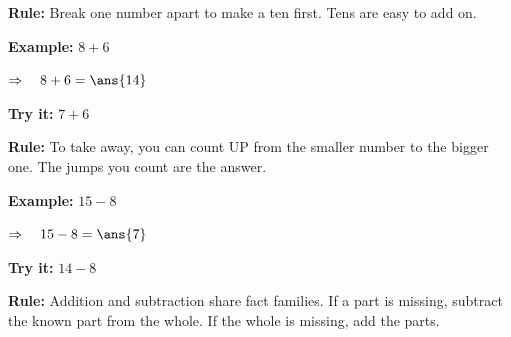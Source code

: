 \documentclass[12pt]{article}
\begin{document}


\begin{formulabox}
\textbf{Rule:} Break one number apart to make a ten first. Tens are easy to
add on.
\end{formulabox}

\begin{examplebox}
\textbf{Example:} \quad $8 + 6$

$\Rightarrow\quad 8 + 6 = \ans{14}$
\end{examplebox}

\begin{tryitbox}
\textbf{Try it:} \quad $7 + 6$\\[2pt]
\end{tryitbox}


\begin{formulabox}
\textbf{Rule:} To take away, you can count UP from the smaller number to the
bigger one. The jumps you count are the answer.
\end{formulabox}

\begin{examplebox}
\textbf{Example:} \quad $15 - 8$

$\Rightarrow\quad 15 - 8 = \ans{7}$
\end{examplebox}

\begin{tryitbox}
\textbf{Try it:} \quad $14 - 8$\\[2pt]
\end{tryitbox}


\begin{formulabox}
\textbf{Rule:} Addition and subtraction share fact families. If a part is
missing, subtract the known part from the whole. If the whole is missing, add
the parts.
\end{formulabox}
\end{document}
